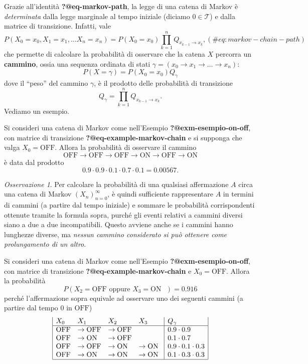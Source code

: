 \documentclass[
  italian,
  letterpaper,
]{book}
\theoremstyle{definition}
\theoremstyle{remark}
\newtheorem*{remark}{Osservazione}
\begin{document}
Grazie all'identità \textbf{?@eq-markov-path}, la legge di una catena di
Markov è \emph{determinata} dalla legge marginale al tempo iniziale
(diciamo \(0 \in \mathcal{T}\)) e dalla matrice di transizione. Infatti,
vale
\begin{equation} P(X_0 = x_0, X_1=x_1, \ldots X_n = x_n) = P(X_0 = x_0) \prod_{k=1}^n Q_{x_{k-1}\to x_{k}},  (\#eq:markov-chain-path) \end{equation}
che permette di calcolare la probabilità di osservare che la catena
\(X\) percorra un \textbf{cammino}, ossia una sequenza ordinata di stati
\(\gamma = (x_0 \to x_1 \to \ldots \to x_n)\):
\[ P(X = \gamma) = P(X_0 = x_0) Q_\gamma\] dove il ``peso'' del cammino
\(\gamma\), è il prodotto delle probabilità di transizione
\[ Q_\gamma = \prod_{k=1}^n Q_{x_{k-1}\to x_{k}}.\] Vediamo un esempio.

Si consideri una catena di Markov come nell'Esempio
\textbf{?@exm-esempio-on-off}, con matrice di transizione
\textbf{?@eq-example-markov-chain} e si supponga che valga
\(X_0=\text{OFF}\). Allora la probabilità di osservare il cammino
\[\text{OFF} \to \text{OFF}  \to \text{OFF}  \to \text{ON} \to \text{OFF}  \to \text{ON}\]
è data dal prodotto
\[ 0.9 \cdot 0.9 \cdot 0.1\cdot 0.7\cdot 0.1 = 0.00567.\]

\begin{remark}
Per calcolare la probabilità di una qualsiasi affermazione \(A\) circa
una catena di Markov \((X_n)_{n=0}^\infty\), è quindi sufficiente
rappresentare \(A\) in termini di cammini (a partire dal tempo iniziale)
e sommare le probabilità corrispondenti ottenute tramite la formula
sopra, purché gli eventi relativi a cammini diversi siano a due a due
incompatibili. Questo avviene anche se i cammini hanno lunghezze
diverse, ma \emph{nessun cammino considerato si può ottenere come
prolungamento di un altro}.
\end{remark}

Si consideri una catena di Markov come nell'Esempio
\textbf{?@exm-esempio-on-off}, con matrice di transizione
\textbf{?@eq-example-markov-chain} e \(X_0=\text{OFF}\). Allora la
probabilità
\[ P( \text{$X_2 =\text{OFF}$ oppure $X_3 = \text{ON}$ } ) = 0.916\]
perché l'affermazione sopra equivale ad osservare uno dei seguenti
cammini (a partire dal tempo \(0\) in \(\text{OFF}\))
\[ \begin{array} {|llll|l|} X_0 & X_1 & X_2 & X_3 & Q_\gamma\\
\hline
\text{OFF} & \to \text{OFF} & \to \text{OFF}& & 0.9 \cdot 0.9 \\
   \text{OFF} & \to  \text{ON} &\to \text{OFF}& & 0.1\cdot 0.7\\
    \text{OFF} & \to \text{OFF} &\to \text{ON} & \to \text{ON }& 0.9\cdot 0.1\cdot 0.3\\
    \text{OFF} & \to \text{ON}  & \to \text{ON} & \to  \text{ON}& 0.1\cdot 0.3 \cdot 0.3\\
    \hline
    \end{array}\]
\end{document}
